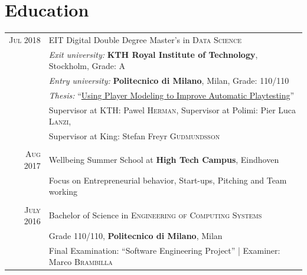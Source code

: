 \documentclass[a4paper,10pt]{article}
\begin{document}

\section{Education}
\begin{tabular}{r|l}

\textsc{Jul} 2018  & 
 EIT Digital Double Degree Master’s in \textsc{Data Science} \\ &
 \emph{Exit university:}  \textbf{KTH Royal Institute of Technology}, Stockholm, Grade: A \\ & 
 \emph{Entry university:} \textbf{Politecnico di Milano}, Milan, \normalsize Grade: 110/110 \\ &
\emph{Thesis:} ``\href{http://urn.kb.se/resolve?urn=urn:nbn:se:kth:diva-232059}{Using Player Modeling to Improve Automatic Playtesting}'' \\ & Supervisor at KTH: Pawel \textsc{Herman}, Supervisor at Polimi: Pier Luca \textsc{Lanzi},\\ & Supervisor at King: Stefan Freyr \textsc{Gudmundsson} \\
 
\multicolumn{2}{c}{}\\
 
\textsc{Aug} 2017 & 
Wellbeing Summer School at \textbf{High Tech Campus}, Eindhoven \\ &
Focus on Entrepreneurial behavior, Start-ups, Pitching and Team working \\ 

\multicolumn{2}{c}{}\\

\textsc{July} 2016 & 
Bachelor of Science in \textsc{Engineering of Computing Systems} \\ &
Grade 110/110, \normalsize\textbf{Politecnico di Milano}, Milan \\ &
Final Examination: ``Software Engineering Project'' | Examiner: Marco \textsc{Brambilla} \\

\end{tabular}

\end{document}
